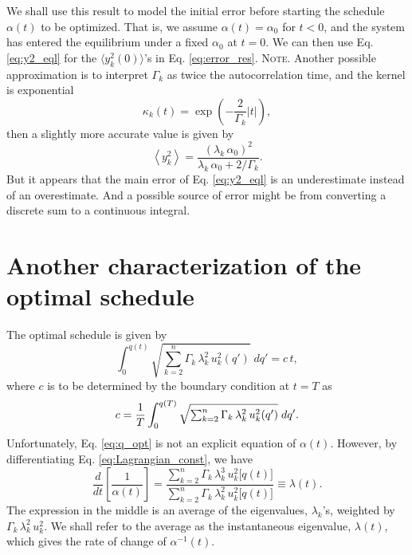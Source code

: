 \documentclass[preprint, floatfix]{revtex4-1}
\newcommand{\note}[1]{{\color{DarkGreen}\footnotesize \textsc{Note.} #1}}
\begin{document}
We shall use this result to model the initial error
before starting the schedule $\alpha(t)$ to be optimized.
%
That is, we assume
$\alpha(t) = \alpha_0$
for $t < 0$, and
the system has entered the equilibrium
under a fixed $\alpha_0$ at $t = 0$.
%
We can then use Eq. \eqref{eq:y2_eql}
for the $\langle y_k^2(0) \rangle$'s in Eq. \eqref{eq:error_res}.
%
\note{Another possible approximation
  is to interpret $\Gamma_k$ as twice the autocorrelation time,
  and the kernel is exponential
  $$
  \kappa_k(t) = \exp\left( - \frac{2}{\Gamma_k} |t| \right),
  $$
  then a slightly more accurate value is given by\cite{vankampen}
  $$
  \left\langle
    y_k^2
  \right\rangle
  =
  \frac{      ( \lambda_k \, \alpha_0 )^2     }
       { \lambda_k \, \alpha_0 + 2 / \Gamma_k }.
  $$
  But it appears that the main error of Eq. \eqref{eq:y2_eql}
  is an underestimate instead of an overestimate.
  And a possible source of error might be from
  converting a discrete sum to a continuous integral.
}



\section{
Another characterization of the optimal schedule}


The optimal schedule is given by
\begin{equation}
  \int_{ 0 }^{ q(t) }
    \sqrt{
      \textstyle\sum_{ k = 2 }^n
        \Gamma_k \, \lambda_k^2
        \, u_k^2( q' )
    }
    \;
    d q'
  =
  c \, t
  ,
  \label{eq:q_opt}
\end{equation}
%
where $c$ is to be determined by
the boundary condition at $t = T$ as
%
\begin{equation}
  c =
  \frac 1 T
  \int_{ 0 }^{ q(T) }
    \sqrt{
      \textstyle\sum_{ k = 2 }^n
        \Gamma_k \, \lambda_k^2
        \, u_k^2( q' )
    }
    \;
    d q'
  .
  \notag
\end{equation}
%
Unfortunately,
Eq. \eqref{eq:q_opt} is not an explicit equation of $\alpha(t)$.
%
However,
by differentiating Eq. \eqref{eq:Lagrangian_const},
we have
%
\begin{equation}
  \frac{ d   }
       { d t }
  \left[
    \frac{       1     }
         { \alpha( t ) }
  \right]
  =
  \frac{
    \sum_{ k = 2 }^n
      \Gamma_k \, \lambda_k^3
      \, u_k^2 \bigl[ q(t) \bigr]
  }
  {
    \sum_{ k = 2 }^n
      \Gamma_k \, \lambda_k^2
      \, u_k^2 \bigl[ q(t) \bigr]
  }
  \equiv
  \lambda(t)
  .
  \label{eq:dinvadt}
\end{equation}
%
The expression in the middle is an average
of the eigenvalues, $\lambda_k$'s,
weighted by $\Gamma_k \, \lambda_k^2 \, u_k^2$.
%
We shall refer to the average as the instantaneous
eigenvalue, $\lambda(t)$,
which gives the rate of change of $\alpha^{-1}(t)$.
\end{document}
